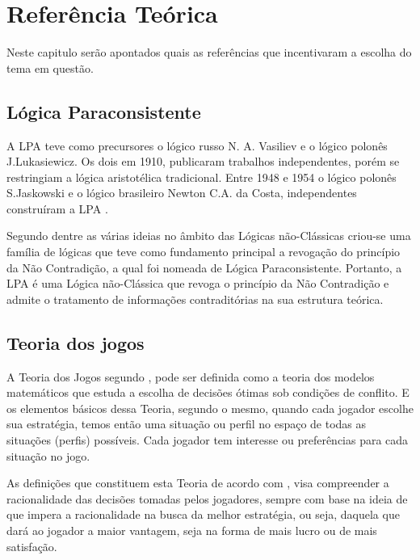 
\chapter{Referência Teórica}

Neste capitulo serão apontados quais as referências que incentivaram a escolha do tema em questão.

\section{Lógica Paraconsistente}

A LPA teve como precursores o lógico russo N. A. Vasiliev e o lógico polonês J.Lukasiewicz. Os dois em 1910, publicaram trabalhos independentes, porém se restringiam a lógica aristotélica tradicional. Entre 1948 e 1954 o lógico polonês S.Jaskowski e o lógico brasileiro Newton C.A. da Costa, independentes construíram a LPA \cite[p. 27]{tomda-decisao-lpa-2011}.

Segundo  dentre as várias ideias no âmbito das Lógicas não-Clássicas criou-se uma família de lógicas que teve como fundamento principal a  revogação do princípio da Não Contradição, a qual foi nomeada de Lógica Paraconsistente. Portanto, a LPA é uma Lógica não-Clássica que
revoga o princípio da Não Contradição e admite o tratamento de informações
contraditórias na sua estrutura teórica.

\section{Teoria dos jogos}

A Teoria dos Jogos segundo , pode ser definida como a teoria dos modelos matemáticos que estuda a escolha de decisões ótimas sob condições de conflito.
E os elementos básicos dessa Teoria, segundo o mesmo, quando cada jogador escolhe sua estratégia, temos então uma situação ou perfil no espaço de todas as situações (perfis) possíveis. Cada jogador tem interesse ou preferências para cada situação no jogo.

As definições que constituem esta Teoria de acordo com , visa compreender a racionalidade das decisões tomadas pelos jogadores, sempre com base na ideia de que impera a racionalidade na busca da melhor estratégia, ou seja, daquela que dará ao jogador a maior vantagem, seja na forma de mais lucro ou de mais satisfação.

